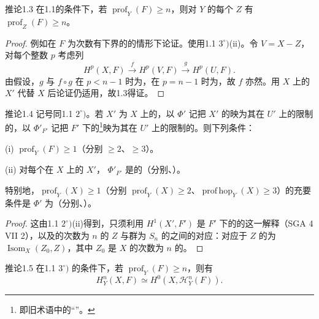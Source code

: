 \begin{SGAresult}{推论}{1.3}
在1.1的条件下，若 $\operatorname{prof}_Y(F)\geq n$，则对 $Y$ 的每个 $Z$ 有 $\operatorname{prof}_Z(F)\geq n$。
\end{SGAresult}
\begin{proof}
例如在 $F$ 为次数有下界的的情形下论证。使用1.1 $3^\circ)$(ii)。令 $V=X-Z$，对每个整数 $p$ 考虑列
\[H^p(X,F)\xrightarrow{f}H^p(V,F)\xrightarrow{g}H^p(U,F).\]
由假设，$g$ 与 $f\circ g$ 在 $p<n-1$ 时为，在 $p=n-1$ 时为，故 $f$ 亦然。用 $X$ 上的 $X'$ 代替 $X$ 后论证仍适用，故1.3得证。
\end{proof}
\begin{SGAresult}{推论}{1.4}
记号同1.1 $2^\circ)$。若 $X'$ 为 $X$ 上的，以 $\Phi'$ 记把 $X'$ 的映为其在 $U'$ 上的限制的，以 $\Phi'_{F'}$ 记把 $F'$ 下的\footnote{即旧术语中的“”。}映为其在 $U'$ 上的限制的。则下列条件：

(i) $\operatorname{prof}_Y(F)\geq1$（分别 $\geq2$、$\geq3$）。

(ii) 对每个在 $X$ 上的 $X'$， $\Phi'_{F'}$ 是的（分别、）。

特别地，$\operatorname{prof}_Y(X)\geq1$（分别 $\operatorname{prof}_Y(X)\geq2$、$\operatorname{prof\,hop}_Y(X)\geq3$）的充要条件是 $\Phi'$ 为（分别、）。
\end{SGAresult}
\begin{proof}
这由1.1 $2^\circ)$(ii)得到，只须利用 $H^1(X',F')$ 是 $F'$ 下的的这一解释（SGA 4 VII 2），以及的次数为 $n$ 的 $Z$ 与群为 $S_n$ 的之间的对应：对应于 $Z$ 的为 $\operatorname{Isom}_X(Z_0,Z)$，其中 $Z_0$ 是 $X$ 的次数为 $n$ 的。
\end{proof}
\begin{SGAresult}{推论}{1.5}
在1.1 $3^\circ)$ 的条件下，若 $\operatorname{prof}_Y(F)\geq n$，则有
\[H_Y^n(X,F)\simeq H^0(X,\mathcal H_Y^n(F)).\]
\end{SGAresult}
